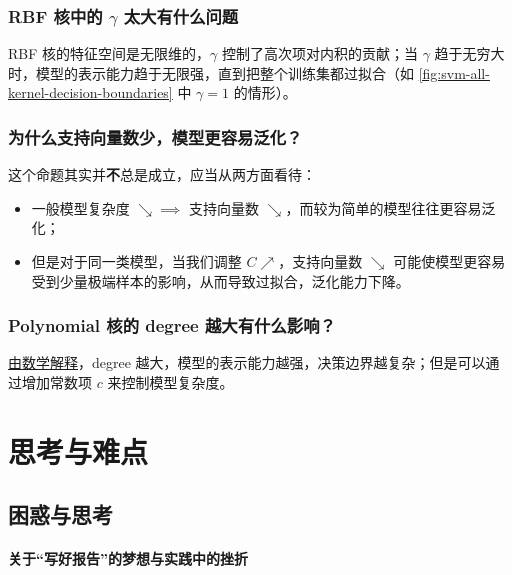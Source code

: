 \documentclass[oneside]{ctexbook}
\begin{document}
\subsubsection{RBF 核中的 $\gamma$ 太大有什么问题}

RBF 核的特征空间是无限维的，$\gamma$ 控制了高次项对内积的贡献；当 $\gamma$ 趋于无穷大时，模型的表示能力趋于无限强，直到把整个训练集都过拟合（如 \ref{fig:svm-all-kernel-decision-boundaries} 中 $\gamma=1$ 的情形）。

\subsubsection{为什么支持向量数少，模型更容易泛化？}


这个命题其实并{\bf 不}总是成立，应当从两方面看待：
\begin{itemize}
    \item 一般模型复杂度 $\searrow \implies$ 支持向量数 $\searrow$，而较为简单的模型往往更容易泛化；
    \item 但是对于同一类模型，当我们调整 $C\nearrow$，支持向量数 $\searrow$ 可能使模型更容易受到少量极端样本的影响，从而导致过拟合，泛化能力下降。
\end{itemize}

\subsubsection{Polynomial 核的 degree 越大有什么影响？}

\href{https://xinchengo.github.io/blog-zh/2025/12/23/%E6%94%AF%E6%8C%81%E5%90%91%E9%87%8F%E6%9C%BA%E5%86%B3%E7%AD%96%E6%A0%91%E4%B8%8E%E9%9B%86%E6%88%90%E5%AD%A6%E4%B9%A0/#%E6%A0%B8%E5%87%BD%E6%95%B0%E4%B8%8E%E6%A0%B8%E6%8A%80%E5%B7%A7}{由数学解释}，degree 越大，模型的表示能力越强，决策边界越复杂；但是可以通过增加常数项 $c$ 来控制模型复杂度。

\section{思考与难点}

\subsection{困惑与思考}

\paragraph{关于“写好报告”的梦想与实践中的挫折}
\end{document}
